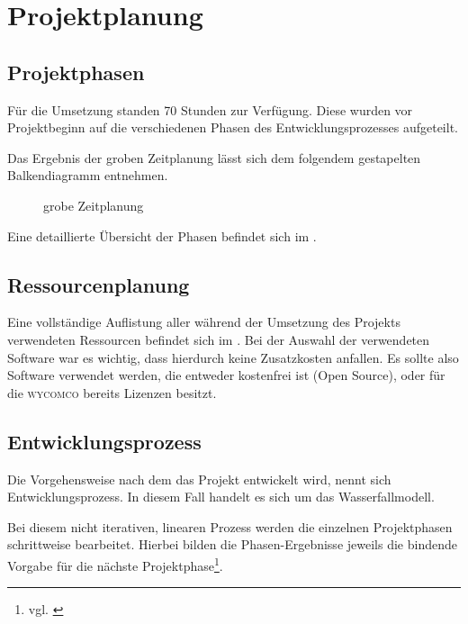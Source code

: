 \section{Projektplanung} 
\label{sec:Projektplanung}

\subsection{Projektphasen}
\label{sec:Projektphasen}

Für die Umsetzung standen 70 Stunden zur Verfügung. Diese wurden vor Projektbeginn auf die verschiedenen Phasen des Entwicklungsprozesses aufgeteilt. 

Das Ergebnis der groben Zeitplanung lässt sich dem folgendem gestapelten Balkendiagramm entnehmen.
 
\begin{figure}[htb]
\centering
{}
\caption{grobe Zeitplanung}
\end{figure}

Eine detaillierte Übersicht der Phasen befindet sich im .


\subsection{Ressourcenplanung}
\label{sec:Ressourcenplanung}

Eine vollständige Auflistung aller während der Umsetzung des Projekts verwendeten Ressourcen befindet sich im . Bei der Auswahl der verwendeten Software war es wichtig, dass hierdurch keine Zusatzkosten anfallen. Es sollte also Software verwendet werden, die entweder kostenfrei ist (\zB Open Source), oder für die \textsc{wycomco} bereits Lizenzen besitzt.


\subsection{Entwicklungsprozess}
\label{sec:Entwicklungsprozess}

Die Vorgehensweise nach dem das Projekt entwickelt wird, nennt sich Entwicklungsprozess. In diesem Fall handelt es sich um das Wasserfallmodell.

Bei diesem nicht iterativen, linearen Prozess werden die einzelnen Projektphasen schrittweise bearbeitet. Hierbei bilden die Phasen-Ergebnisse jeweils die bindende Vorgabe für die nächste
Projektphase\footnote{vgl. \cite[S. 263]{ItHandbuch}}.

